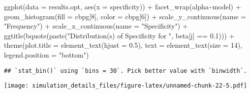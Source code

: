 \documentclass[
]{article}
\newenvironment{Shaded}{\begin{snugshade}}{\end{snugshade}}
\newcommand{\AttributeTok}[1]{\textcolor[rgb]{0.77,0.63,0.00}{#1}}
\newcommand{\DecValTok}[1]{\textcolor[rgb]{0.00,0.00,0.81}{#1}}
\newcommand{\FloatTok}[1]{\textcolor[rgb]{0.00,0.00,0.81}{#1}}
\newcommand{\FunctionTok}[1]{\textcolor[rgb]{0.00,0.00,0.00}{#1}}
\newcommand{\NormalTok}[1]{#1}
\newcommand{\SpecialCharTok}[1]{\textcolor[rgb]{0.00,0.00,0.00}{#1}}
\newcommand{\StringTok}[1]{\textcolor[rgb]{0.31,0.60,0.02}{#1}}
\begin{document}
\begin{Shaded}
\begin{Highlighting}[]
\FunctionTok{ggplot}\NormalTok{(}\AttributeTok{data =}\NormalTok{ results.opt,}
       \FunctionTok{aes}\NormalTok{(}\AttributeTok{x =}\NormalTok{ specificity)) }\SpecialCharTok{+}
  \FunctionTok{facet\_wrap}\NormalTok{(alpha}\SpecialCharTok{\textasciitilde{}}\NormalTok{model) }\SpecialCharTok{+}
  \FunctionTok{geom\_histogram}\NormalTok{(}\AttributeTok{fill =}\NormalTok{ cbpg[}\DecValTok{8}\NormalTok{], }\AttributeTok{color =}\NormalTok{ cbpg[}\DecValTok{6}\NormalTok{]) }\SpecialCharTok{+}
  \FunctionTok{scale\_y\_continuous}\NormalTok{(}\AttributeTok{name =} \StringTok{"Frequency"}\NormalTok{) }\SpecialCharTok{+}
  \FunctionTok{scale\_x\_continuous}\NormalTok{(}\AttributeTok{name =} \StringTok{"Specificity"}\NormalTok{) }\SpecialCharTok{+}
  \FunctionTok{ggtitle}\NormalTok{(}\FunctionTok{bquote}\NormalTok{(}\FunctionTok{paste}\NormalTok{(}\StringTok{"Distribution(s) of Specificity for "}\NormalTok{, beta[j] }\SpecialCharTok{==} \FloatTok{0.1}\NormalTok{))) }\SpecialCharTok{+}
  \FunctionTok{theme}\NormalTok{(}\AttributeTok{plot.title =} \FunctionTok{element\_text}\NormalTok{(}\AttributeTok{hjust =} \FloatTok{0.5}\NormalTok{), }
        \AttributeTok{text =} \FunctionTok{element\_text}\NormalTok{(}\AttributeTok{size =} \DecValTok{14}\NormalTok{),}
        \AttributeTok{legend.position =} \StringTok{"bottom"}\NormalTok{)}
\end{Highlighting}
\end{Shaded}

\begin{verbatim}
## `stat_bin()` using `bins = 30`. Pick better value with `binwidth`.
\end{verbatim}

\texttt{[image: simulation\_details\_files/figure-latex/unnamed-chunk-22-5.pdf]}
\end{document}
